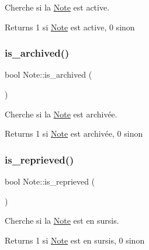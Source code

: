 Cherche si la \hyperlink{class_note}{Note} est active. 

\begin{DoxyReturn}{Returns}
1 si \hyperlink{class_note}{Note} est active, 0 sinon 
\end{DoxyReturn}
\mbox{\label{class_note_a59f2e98d827736fefc03a71606db7e3d}} 
\subsubsection{\texorpdfstring{is\+\_\+archived()}{is\_archived()}}
{\footnotesize\ttfamily bool Note\+::is\+\_\+archived (\begin{DoxyParamCaption}{ }\end{DoxyParamCaption})\hspace{0.3cm}{\ttfamily [inline]}}



Cherche si la \hyperlink{class_note}{Note} est archivée. 

\begin{DoxyReturn}{Returns}
1 si \hyperlink{class_note}{Note} est archivée, 0 sinon 
\end{DoxyReturn}
\mbox{\label{class_note_a35ed46ae39aedc142d4fd9461a3d6a33}} 
\subsubsection{\texorpdfstring{is\+\_\+reprieved()}{is\_reprieved()}}
{\footnotesize\ttfamily bool Note\+::is\+\_\+reprieved (\begin{DoxyParamCaption}{ }\end{DoxyParamCaption})\hspace{0.3cm}{\ttfamily [inline]}}



Cherche si la \hyperlink{class_note}{Note} est en sursis. 

\begin{DoxyReturn}{Returns}
1 si \hyperlink{class_note}{Note} est en sursis, 0 sinon 
\end{DoxyReturn}
\mbox{\label{class_note_a19cfb61168f8f6ce29cbdefd8448c0c0}} 
